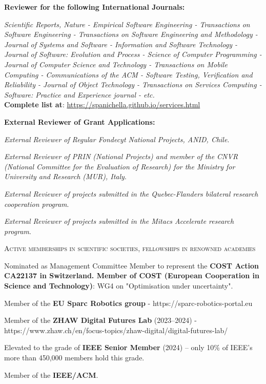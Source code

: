 \documentclass[11pt]{article}
\begin{document}
\medskip 

\textbf{Reviewer for the following International Journals:}
\begin{innerlist}
\item \emph{Scientific Reports, Nature - Empirical Software Engineering - Transactions on Software Engineering - Transactions on Software Engineering and Methodology - Journal of Systems and Software - Information and Software Technology - Journal of Software: Evolution and Process - Science of Computer Programming - Journal of Computer Science and Technology - Transactions on Mobile Computing - Communications of the ACM - Software Testing, Verification and Reliability - Journal of Object Technology - Transactions on Services Computing - Software: Practice and Experience journal - etc.} 
\\ \textbf{Complete list at}: \href{https://spanichella.github.io/services.html}{https://spanichella.github.io/services.html}
\end{innerlist} 

\medskip 

\textbf{External Reviewer of Grant Applications:}
\begin{innerlist}
   \item \emph{External Reviewer of Regular Fondecyt National Projects, ANID, Chile}.
   \item \emph{External Reviewer of PRIN (National Projects) and member of the CNVR (National Committee for the Evaluation of Research) for the Ministry for University and Research (MUR), Italy}.
   \item \emph{External Reviewer of projects submitted in the Quebec-Flanders bilateral research cooperation program}.
   \item \emph{External Reviewer of projects submitted in the Mitacs Accelerate research program}.
\end{innerlist}

\medskip 

\textsc{Active memberships in scientific societies, fellowships in renowned academies}

\begin{innerlist}
\item Nominated as Management Committee Member to represent the \textbf{COST Action CA22137 in Switzerland. Member of COST (European Cooperation in Science and Technology)}: WG4 on "Optimisation under uncertainty".
\item Member of the \textbf{EU Sparc Robotics group} - https://sparc-robotics-portal.eu
\item Member of the \textbf{ZHAW Digital Futures Lab} (2023–2024) - https://www.zhaw.ch/en/focus-topics/zhaw-digital/digital-futures-lab/
\item Elevated to the grade of \textbf{IEEE Senior Member} (2024) – only 10\% of IEEE’s more than 450,000 members hold this grade.
\item Member of the \textbf{IEEE/ACM}.
\end{innerlist}
\end{document}

